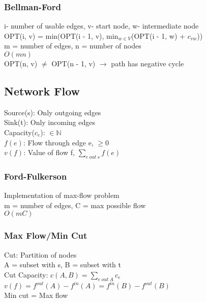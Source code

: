 \documentclass{article}
\begin{document}
\begin{multicols*}{2}
        \subsubsection*{Bellman-Ford}
        i- number of usable edges, v- start node, w- intermediate node\\
        OPT(i, v) = min(OPT(i - 1, v), min$_{w\in V}$(OPT(i - 1, w) + $c_{vw}$))\\
        m = number of edges, n = number of nodes\\
        $O(mn)$\\
        OPT(n, v) $\neq$ OPT(n - 1, v) $\to$ path has negative cycle
        \subsection*{Network Flow}
        Source(s): Only outgoing edges\\
        Sink(t): Only incoming edges\\
        Capacity($c_e$): $\in \mathbb{N}$\\
        $f(e)$: Flow through edge e, $\geq$0\\
        $v(f)$: Value of flow f, $\sum_{e\ out\ s} f(e)$
        \subsubsection*{Ford-Fulkerson}
        Implementation of max-flow problem\\
        m = number of edges, C = max possible flow\\
        $O(mC)$
        \subsubsection*{Max Flow/Min Cut}
        Cut: Partition of nodes\\
        A = subset with s, B = subset with t\\
        Cut Capacity: $c(A, B) = \sum_{e\ out\ A} c_e$\\
        $v(f) = f^{out}(A) - f^{in}(A) = f^{in}(B) - f^{out}(B)$\\
        Min cut = Max flow
    \end{multicols*}
\end{document}
